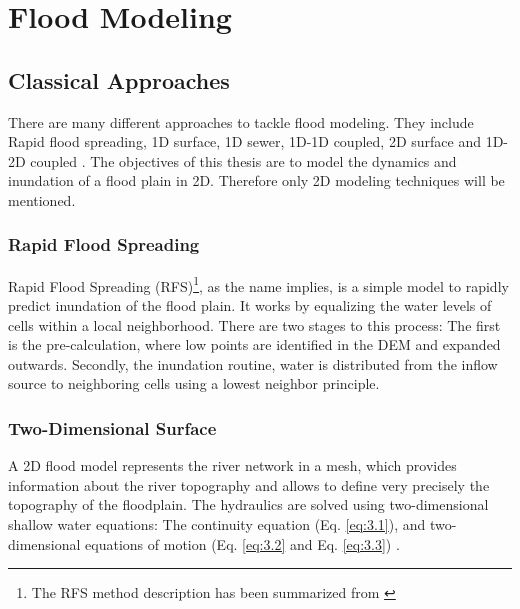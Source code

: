 
\chapter{Flood Modeling} %
\label{Chapter3} %
\section{Classical Approaches}

There are many different approaches to tackle flood modeling. They include Rapid flood spreading, 1D surface, 1D sewer, 1D-1D coupled, 2D surface and 1D-2D coupled \cite{bulti2020review}. The objectives of this thesis are to model the dynamics and inundation of a flood plain in 2D. Therefore only 2D modeling techniques will be mentioned.

\subsection*{Rapid Flood Spreading} 

Rapid Flood Spreading (RFS)\footnote{The RFS method description has been summarized from \citeauthor{liu2010new} \cite{liu2010new}}, as the name implies, is a simple model to rapidly predict inundation of the flood plain. It works by equalizing the water levels of cells within a local neighborhood. There are two stages to this process:  The first is the pre-calculation, where low points are identified in the DEM and expanded outwards. Secondly, the inundation routine, water is distributed from the inflow source to neighboring cells using a lowest neighbor principle.

	
\subsection*{Two-Dimensional Surface}
A 2D flood model represents the river network in a mesh, which provides information about the river topography and allows to define very precisely the topography of the floodplain. The hydraulics are solved using two-dimensional shallow  water equations: The continuity equation (Eq. \ref{eq:3.1}), and two-dimensional equations of motion \cite{o1993two} (Eq. \ref{eq:3.2} and Eq. \ref{eq:3.3}) .

